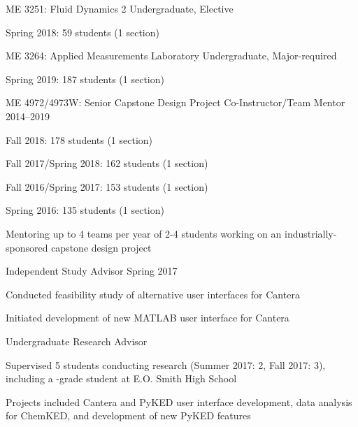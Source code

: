 \begin{outerlist}
\item ME 3251: Fluid Dynamics 2 \hfill Undergraduate, Elective
\begin{innerlist}
    \item Spring 2018: 59 students (1 section)
\end{innerlist}

\item ME 3264: Applied Measurements Laboratory \hfill Undergraduate, Major-required
\begin{innerlist}
    \item Spring 2019: 187 students (1 section)
\end{innerlist}

\item ME 4972/4973W: Senior Capstone Design Project Co-Instructor/Team Mentor \hfill 2014--2019
\begin{innerlist}
    \item Fall 2018: 178 students (1 section)
    \item Fall 2017/Spring 2018: 162 students (1 section)
    \item Fall 2016/Spring 2017: 153 students (1 section)
    \item Spring 2016: 135 students (1 section)
    \item Mentoring up to 4 teams per year of 2-4 students working on an
    industrially-sponsored capstone design project
\end{innerlist}

\item Independent Study Advisor \hfill Spring 2017
\begin{innerlist}
    \item Conducted feasibility study of alternative user interfaces for Cantera
    \item Initiated development of new \textsc{MATLAB} user interface for Cantera
\end{innerlist}

\item Undergraduate Research Advisor
\begin{innerlist}
    \item Supervised 5 students conducting research (Summer 2017: 2, Fall 2017: 3), including a -grade student at E.O. Smith High School
    \item Projects included Cantera and PyKED user interface development, data analysis for ChemKED, and development of new PyKED features
\end{innerlist}

\end{outerlist}

